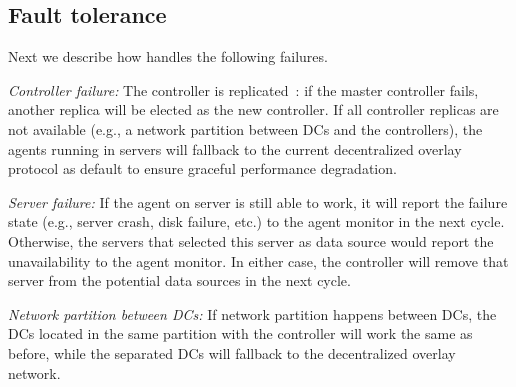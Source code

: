 \subsection{Fault tolerance}
\label{subsec:system:fault}
Next we describe how \name handles the following failures.

\begin{packedenumerate}
\item \emph{Controller failure:} The \name controller is 
replicated~\cite{lamport1998part}: if the master controller fails, 
another replica will be elected as the new controller. If all 
controller replicas are not available (e.g., a network partition 
between DCs and the controllers), the agents running in servers will 
fallback to the current decentralized overlay protocol as default to 
ensure graceful performance degradation.
\item \emph{Server failure:} If the agent on server is still able to 
work, it will report the failure state (e.g., server crash, disk 
failure, etc.) to the agent monitor in the next cycle. Otherwise, the
servers that selected this server as data source would report the 
unavailability to the agent monitor. In either case, the controller 
will remove that server from the potential data sources in the next 
cycle.
\item \emph{Network partition between DCs:}
If network partition happens between DCs, the DCs located in the same
partition with the controller will work the same as before, while the 
separated DCs will fallback to the decentralized overlay network.
\end{packedenumerate}



